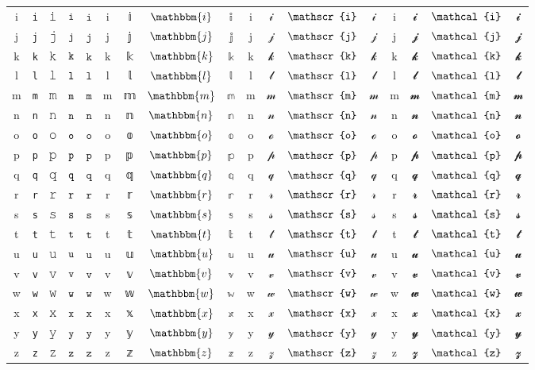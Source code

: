 \documentclass[10pt]{standalone}
\newcommand{\TT}[1]{\ifmmode\mathtt{#1}\else\texttt{#1}\fi}
\newcommand{\BB}[1]{\ifmmode\mathbbm{#1}\else#1\fi}
\newcommand{\SCR}[1]{\ifmmode\mathscr{#1}\else#1\fi}
\newcommand{\CAL}[1]{\ifmmode\mathcal{#1}\else#1\fi}
\begin{document}
\begin{tabular}{c|cc|cc|cc|cc|cc|cc|cc|cc}
i & \TT{i} & 𝚒 & $\TT{i}$ & $𝚒$ & \BB{i} & 𝕚 & $\BB{i}$ & $𝕚$ & \SCR{i} & 𝒾 & $\SCR{i}$ & $𝒾$ & \CAL{i} & 𝓲 & $\CAL{i}$ & $𝓲$ \\
j & \TT{j} & 𝚓 & $\TT{j}$ & $𝚓$ & \BB{j} & 𝕛 & $\BB{j}$ & $𝕛$ & \SCR{j} & 𝒿 & $\SCR{j}$ & $𝒿$ & \CAL{j} & 𝓳 & $\CAL{j}$ & $𝓳$ \\
k & \TT{k} & 𝚔 & $\TT{k}$ & $𝚔$ & \BB{k} & 𝕜 & $\BB{k}$ & $𝕜$ & \SCR{k} & 𝓀 & $\SCR{k}$ & $𝓀$ & \CAL{k} & 𝓴 & $\CAL{k}$ & $𝓴$ \\
l & \TT{l} & 𝚕 & $\TT{l}$ & $𝚕$ & \BB{l} & 𝕝 & $\BB{l}$ & $𝕝$ & \SCR{l} & 𝓁 & $\SCR{l}$ & $𝓁$ & \CAL{l} & 𝓵 & $\CAL{l}$ & $𝓵$ \\
m & \TT{m} & 𝚖 & $\TT{m}$ & $𝚖$ & \BB{m} & 𝕞 & $\BB{m}$ & $𝕞$ & \SCR{m} & 𝓂 & $\SCR{m}$ & $𝓂$ & \CAL{m} & 𝓶 & $\CAL{m}$ & $𝓶$ \\
n & \TT{n} & 𝚗 & $\TT{n}$ & $𝚗$ & \BB{n} & 𝕟 & $\BB{n}$ & $𝕟$ & \SCR{n} & 𝓃 & $\SCR{n}$ & $𝓃$ & \CAL{n} & 𝓷 & $\CAL{n}$ & $𝓷$ \\
o & \TT{o} & 𝚘 & $\TT{o}$ & $𝚘$ & \BB{o} & 𝕠 & $\BB{o}$ & $𝕠$ & \SCR{o} & ℴ & $\SCR{o}$ & $ℴ$ & \CAL{o} & 𝓸 & $\CAL{o}$ & $𝓸$ \\
p & \TT{p} & 𝚙 & $\TT{p}$ & $𝚙$ & \BB{p} & 𝕡 & $\BB{p}$ & $𝕡$ & \SCR{p} & 𝓅 & $\SCR{p}$ & $𝓅$ & \CAL{p} & 𝓹 & $\CAL{p}$ & $𝓹$ \\
q & \TT{q} & 𝚚 & $\TT{q}$ & $𝚚$ & \BB{q} & 𝕢 & $\BB{q}$ & $𝕢$ & \SCR{q} & 𝓆 & $\SCR{q}$ & $𝓆$ & \CAL{q} & 𝓺 & $\CAL{q}$ & $𝓺$ \\
r & \TT{r} & 𝚛 & $\TT{r}$ & $𝚛$ & \BB{r} & 𝕣 & $\BB{r}$ & $𝕣$ & \SCR{r} & 𝓇 & $\SCR{r}$ & $𝓇$ & \CAL{r} & 𝓻 & $\CAL{r}$ & $𝓻$ \\
s & \TT{s} & 𝚜 & $\TT{s}$ & $𝚜$ & \BB{s} & 𝕤 & $\BB{s}$ & $𝕤$ & \SCR{s} & 𝓈 & $\SCR{s}$ & $𝓈$ & \CAL{s} & 𝓼 & $\CAL{s}$ & $𝓼$ \\
t & \TT{t} & 𝚝 & $\TT{t}$ & $𝚝$ & \BB{t} & 𝕥 & $\BB{t}$ & $𝕥$ & \SCR{t} & 𝓉 & $\SCR{t}$ & $𝓉$ & \CAL{t} & 𝓽 & $\CAL{t}$ & $𝓽$ \\
u & \TT{u} & 𝚞 & $\TT{u}$ & $𝚞$ & \BB{u} & 𝕦 & $\BB{u}$ & $𝕦$ & \SCR{u} & 𝓊 & $\SCR{u}$ & $𝓊$ & \CAL{u} & 𝓾 & $\CAL{u}$ & $𝓾$ \\
v & \TT{v} & 𝚟 & $\TT{v}$ & $𝚟$ & \BB{v} & 𝕧 & $\BB{v}$ & $𝕧$ & \SCR{v} & 𝓋 & $\SCR{v}$ & $𝓋$ & \CAL{v} & 𝓿 & $\CAL{v}$ & $𝓿$ \\
w & \TT{w} & 𝚠 & $\TT{w}$ & $𝚠$ & \BB{w} & 𝕨 & $\BB{w}$ & $𝕨$ & \SCR{w} & 𝓌 & $\SCR{w}$ & $𝓌$ & \CAL{w} & 𝔀 & $\CAL{w}$ & $𝔀$ \\
x & \TT{x} & 𝚡 & $\TT{x}$ & $𝚡$ & \BB{x} & 𝕩 & $\BB{x}$ & $𝕩$ & \SCR{x} & 𝓍 & $\SCR{x}$ & $𝓍$ & \CAL{x} & 𝔁 & $\CAL{x}$ & $𝔁$ \\
y & \TT{y} & 𝚢 & $\TT{y}$ & $𝚢$ & \BB{y} & 𝕪 & $\BB{y}$ & $𝕪$ & \SCR{y} & 𝓎 & $\SCR{y}$ & $𝓎$ & \CAL{y} & 𝔂 & $\CAL{y}$ & $𝔂$ \\
z & \TT{z} & 𝚣 & $\TT{z}$ & $𝚣$ & \BB{z} & 𝕫 & $\BB{z}$ & $𝕫$ & \SCR{z} & 𝓏 & $\SCR{z}$ & $𝓏$ & \CAL{z} & 𝔃 & $\CAL{z}$ & $𝔃$ \\
\bottomrule
\end{tabular}
\end{document}
